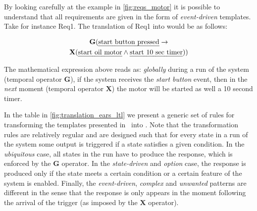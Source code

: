 By looking carefully at the example in \fig\ref{fig:reqs_motor} it is possible
to understand that all requirements are given in the form of \ears
\emph{event-driven} templates. Take for instance Req1. The translation of Req1
into \ltl would be as follows:

\begin{multline*}
\mathbf{G}(\text{\emph{start button pressed}} \rightarrow\\
\textbf{X}(\text{\emph{start oil motor}}\land \text{\emph{start 10 sec timer}}))
\end{multline*}

The mathematical expression above reads as: \emph{globally}
during a run of the system (temporal operator $\mathbf{G}$), if the system
receives the \emph{start button} event, then in the \emph{next} moment
(temporal operator $\mathbf{X}$) the motor will be started as well a 10 second timer.

In the table in \fig\ref{fig:translation_ears_ltl} we present a generic set of
rules for transforming the \ears templates presented in~\cite{EARS09} into \ltl. Note that
the transformation rules are relatively regular and are designed such that for
every state in a run of the system some output is triggered if a state satisfies
a given condition. In the \emph{ubiquitous} case, all states in the run have to
produce the response, which is enforced by the $\mathbf{G}$ operator. In the
\emph{state-driven} and \emph{option} case, the response is produced only if the
state meets a certain condition or a certain feature of the system is enabled.
Finally, the \emph{event-driven}, \emph{complex} and \emph{unwanted} patterns
are different in the sense that the response is only appears in the moment following
the arrival of the trigger (as imposed by the $\mathbf{X}$ operator).
